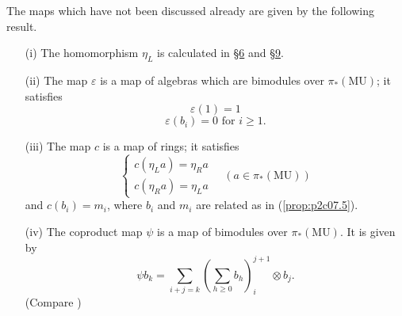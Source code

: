 \documentclass[../main]{subfiles}
\begin{document}
The maps which have not been discussed already are given by the following result. 
\begin{theorem}
\label{thm:p2c11.3}
\begin{enumerate}
    \item[(i)] The homomorphism $\eta_L$ is calculated in \hyperref[sec:p2c6]{\S 6} and \hyperref[sec:p2c9]{\S 9}.
    \item[(ii)] The map $\varepsilon$ is a map of algebras which are bimodules over $\pi_\ast(\mathrm{MU})$; it satisfies $$\varepsilon(1) = 1$$ 
    $$\varepsilon(b_i) = 0 \text { for } i \ge 1.$$
    \item[(iii)] The map $c$ is a map of rings; it satisfies $$\begin{cases}c(\eta_L a) = \eta_R a \\ c(\eta_R a) = \eta_L a\end{cases} \quad (a \in \pi_\ast(\mathrm{MU}))$$ and $c(b_i) = m_i$, where $b_i$ and $m_i$ are related as in (\ref{prop:p2c07.5}).
    \item[(iv)] The coproduct map $\psi$ is a map of bimodules over $\pi_\ast(\mathrm{MU})$. It is given by $$\displaystyle \psi b_k = \sum_{i + j = k} \left(\sum_{h \ge 0} b_h\right)_i^{j + 1} \otimes b_j.$$ (Compare \cite[p.~20, Theorem 6.3]{adams2})
\end{enumerate}
\end{theorem}
\end{document}

